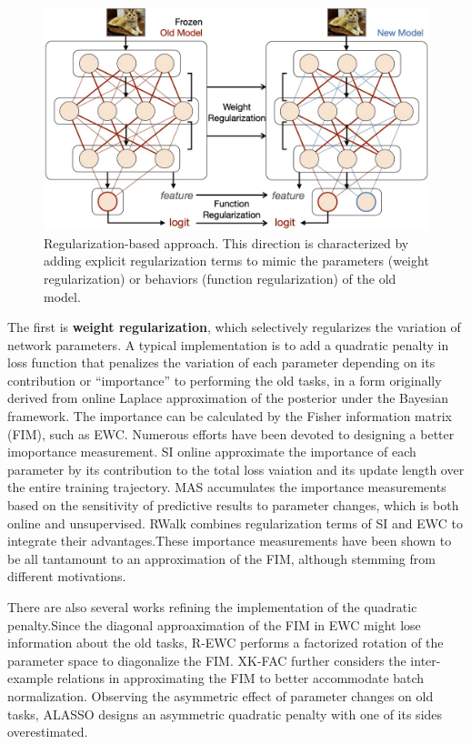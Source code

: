 \begin{figure}[H]
    \centering
    \includegraphics[width=0.7\linewidth]{imgs/continual_learning/cl_2.png}
    \caption{Regularization-based approach. This direction is characterized by adding explicit regularization terms to mimic the parameters (weight regularization) or behaviors (function regularization) of the old model.}
    \label{cl_2}
\end{figure}

The first is \textbf{weight regularization}, which selectively regularizes the variation of network parameters. A typical implementation is to add a quadratic penalty in loss function that penalizes the variation of each parameter depending on its contribution or ``importance'' to performing the old tasks, in a form originally derived from online Laplace approximation of the posterior under the Bayesian framework. The importance can be calculated by the Fisher information matrix (FIM), such as EWC. Numerous efforts have been devoted to designing a better imoportance measurement. SI online approximate the importance of each parameter by its contribution to the total loss vaiation and its update length over the entire training trajectory. MAS accumulates the importance measurements based on the sensitivity of predictive results to parameter changes, which is both online and unsupervised. RWalk combines regularization terms of SI and EWC to integrate their advantages.These importance measurements have been shown to be all tantamount to an approximation of the FIM, although stemming from different motivations.

There are also several works refining the implementation of the quadratic penalty.Since the diagonal approaximation of the FIM in EWC might lose information about the old tasks, R-EWC performs a factorized rotation of the parameter space to diagonalize the FIM. XK-FAC further considers the inter-example relations in approximating the FIM to better accommodate batch normalization. Observing the asymmetric effect of parameter changes on old tasks, ALASSO designs an asymmetric quadratic penalty with one of its sides overestimated.

